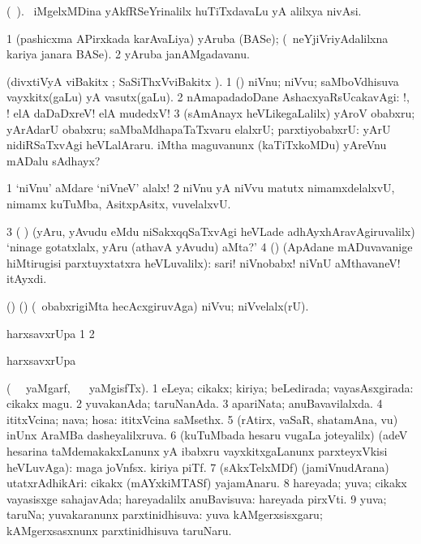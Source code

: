 \bentry
{} 
\gl{\nA} 
\bmng
(\bava\ ).
\kanu\ iMgelxMDina yAkfRSeYrinalilx huTiTxdavaLu yA alilxya nivAsi.
\emng
\eentry

\bentry
{} 
\gl{\nA} 
\bmng
\bnum
\num{1} (pashicxma APirxkada karAvaLiya) yAruba (BASe); (\kanmu\ neYjiVriyAdalilxna kariya janara BASe). 
\num{2} yAruba janAMgadavanu.
\enum
\emng
\eentry

\bentry
{} 
\gl{\sanA} 
\bmng
(divxtiVyA viBakitx ; SaSiThxVviBakitx ). 
\bnum
\num{1} (\Eva)  niVnu; niVvu; saMboVdhisuva vayxkitx(gaLu) yA vasutx(gaLu). 
\num{2} nAmapadadoDane AshacxyaRsUcakavAgi: !, ! elA daDaDxreV! elA mudedxV! 
\num{3} (sAmAnayx heVLikegaLalilx) yAroV obabxru; yArAdarU obabxru; saMbaMdhapaTaTxvaru elalxrU; parxtiyobabxrU:  yArU nidiRSaTxvAgi heVLalAraru.  iMtha maguvanunx (kaTiTxkoMDu) yAreVnu mADalu sAdhayx?
\enum
\emng

\noindent
\gl{\pagu} 
\bmng
\bnum
\num{1}  `niVnu' aMdare `niVneV' alalx! 
\num{2}  niVnu yA niVvu matutx nimamxdelalxvU, nimamx kuTuMba, AsitxpAsitx, \mo vuvelalxvU. 
\num{3}  ( ) (yAru, yAvudu eMdu niSakxqqSaTxvAgi heVLade adhAyxhAravAgiruvalilx) `ninage gotatxlalx, yAru (athavA yAvudu) aMta?' 
\num{4}  (\AmA) (ApAdane mADuvavanige hiMtirugisi parxtuyxtatxra heVLuvalilx): sari! niVnobabx! niVnU aMthavaneV! itAyxdi.
\enum
\emng
\eentry

\bentry
{} 
\gl{\sanA} 
\bmng
(\ame) (\AmA) (\sA\ obabxrigiMta hecAcxgiruvAga) niVvu; niVvelalx(rU).
\emng
\eentry

\bentry
{} 
\gl{}
\bmng
harxsavxrUpa 
\bnum
\num{1}  
\num{2} 
\enum
\emng
\eentry

\bentry
{} 
\gl{}
\bmng
harxsavxrUpa 
\emng 
\eentry

\bentry
{} 
\gl{\gu} 
\bmng
(\tara\  \ucAcx\ yaMgarf, \tama\  \ucAcx\ yaMgisfTx). 
\bnum
\num{1} eLeya; cikakx; kiriya; beLedirada; vayasAsxgirada:  cikakx magu. 
\num{2} yuvakanAda; taruNanAda. 
\num{3} apariNata; anuBavavilalxda. 
\num{4} ititxVcina; nava; hosa:  ititxVcina saMsethx. 
\num{5} (rAtirx, vaSaR, shatamAna, \mo vu) inUnx AraMBa dasheyalilxruva. 
\num{6} (kuTuMbada hesaru \mo vugaLa joteyalilx) (adeV hesarina taMdemakakxLanunx yA ibabxru vayxkitxgaLanunx parxteyxVkisi heVLuvAga):  maga joVnfsx.   kiriya piTf. 
\num{7} (sAkxTelxMDf) (jamiVnudArana) utatxrAdhikAri:  cikakx (mAYxkiMTASf) yajamAnaru. 
\num{8} hareyada; yuva; cikakx vayasisxge sahajavAda; hareyadalilx anuBavisuva:  hareyada pirxVti. 
\num{9}  yuva; taruNa; yuvakaranunx parxtinidhisuva:   yuva kAMgerxsisxgaru; kAMgerxsasxnunx parxtinidhisuva taruNaru.
\enum
\emng

